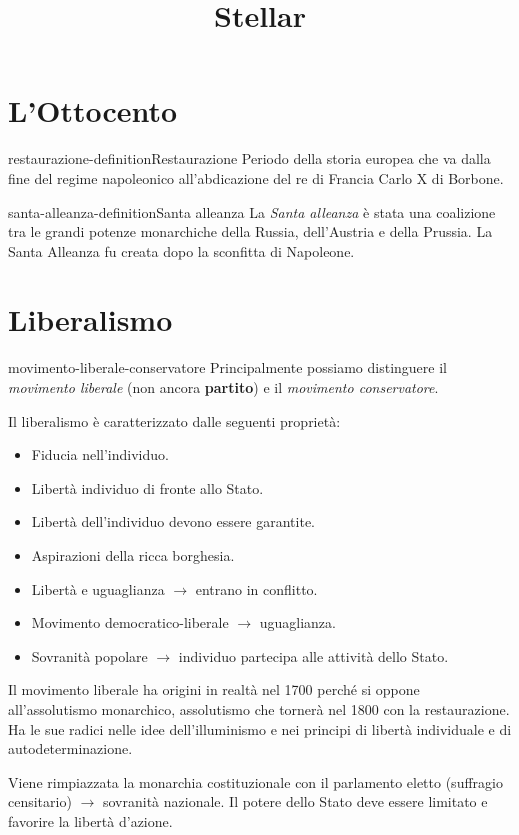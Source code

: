 \documentclass[preview]{standalone}
\begin{document}
\title{Stellar}
\genpage

\section{L'Ottocento}

\begin{snippetdefinition}{restaurazione-definition}{Restaurazione}
    Periodo della storia europea che va dalla fine del regime napoleonico
    all'abdicazione del re di Francia Carlo X di Borbone.
\end{snippetdefinition}

\begin{snippetdefinition}{santa-alleanza-definition}{Santa alleanza}
    La \textit{Santa alleanza} è stata una coalizione tra le grandi potenze monarchiche della Russia, dell'Austria e della Prussia.
    La Santa Alleanza fu creata dopo la sconfitta di Napoleone.
\end{snippetdefinition}

\section{Liberalismo}

\begin{snippet}{movimento-liberale-conservatore}
    Principalmente possiamo distinguere il \textit{movimento liberale} (non ancora \textbf{partito})
    e il \textit{movimento conservatore}.

    Il liberalismo è caratterizzato dalle seguenti proprietà:
    \begin{itemize}
        \item Fiducia nell'individuo.
        \item Libertà individuo di fronte allo Stato.
        \item Libertà dell'individuo devono essere garantite.
        \item Aspirazioni della ricca borghesia.
        \item Libertà e uguaglianza \(\rightarrow\) entrano in conflitto.
        \item Movimento democratico-liberale \(\rightarrow\) uguaglianza.
        \item Sovranità popolare \(\rightarrow\) individuo partecipa alle attività dello Stato.
    \end{itemize}

    Il movimento liberale ha origini in realtà nel 1700 perché si oppone
    all'assolutismo monarchico, assolutismo che tornerà nel 1800 con la restaurazione.
    Ha le sue radici nelle idee dell'illuminismo e nei principi di libertà individuale e di autodeterminazione.

    Viene rimpiazzata la monarchia costituzionale con il parlamento eletto (suffragio censitario)
    \(\rightarrow\) sovranità nazionale.
    Il potere dello Stato deve essere limitato e favorire la libertà d'azione.
\end{snippet}
\end{document}
